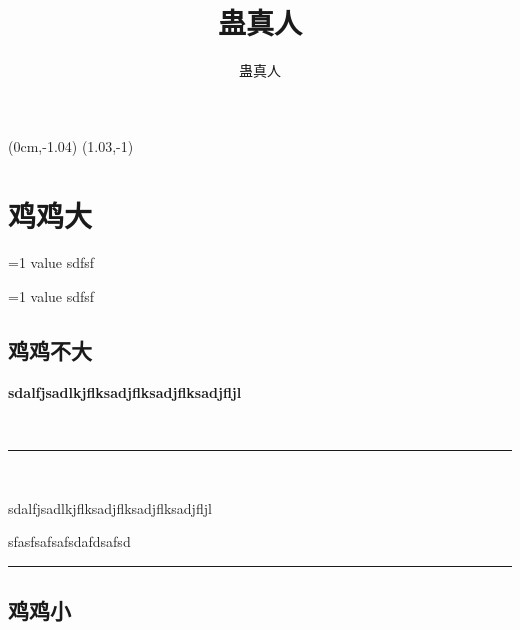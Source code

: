 \documentclass[hyperref,UTF8]{ctexrep}
\title{蛊真人}
\author{蛊真人}
\newenvironment{thisBody}
	{
		\zihao{3}
	}%
	{
		\clearpage
	}%
\begin{document}
\fancyput*(0cm,-1.04\textheight){ \setlength\fboxsep{0pt} \noindent\framebox[1.03\textwidth]{ \noindent \rule{0cm}{ 1.04\textheight } } }
\fancyput*(1.03\textwidth,-1\textheight){ \setlength\fboxsep{0pt} \noindent\framebox[2cm]{ \noindent \rule{0cm}{ \textheight } } }

 
\maketitle%
 

 


\newcommand\testvvvv[1]{ \ifnum #1=1 value \fi sdfsf }


\chapter{鸡鸡大}


\testvvvv{1}

\testvvvv{0}

\setcounter{secnumdepth}{-2}
\section{鸡鸡不大}
\setcounter{secnumdepth}{3}

	\begin{thisBody} 
		\textbf {sdalfjsadlkjflksadjflksadjflksadjfljl}

\noindent \, \hfill \rule[0.5ex]{0.95\linewidth}{0.5pt} \hfill \,

\noindent		\dag \hfill sdalfjsadlkjflksadjflksadjflksadjfljl \hfill \dag 

		sfasfsafsafsdafdsafsd
	\end{thisBody}

\noindent\rule[0.5ex]{\columnwidth}{0.6pt}
\section{鸡鸡小}
\end{document}
